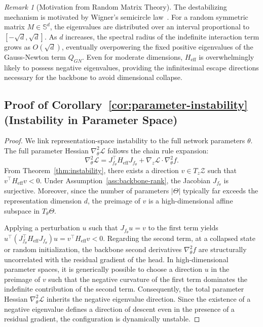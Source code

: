 \documentclass{article}
\theoremstyle{plain}
\theoremstyle{definition}
\theoremstyle{remark}
\newtheorem{remark}[theorem]{Remark}
\begin{document}
\begin{remark}[Motivation from Random Matrix Theory]
The destabilizing mechanism is motivated by Wigner's semicircle law~\citep{rudelson2010nonasymptotic}. For a random symmetric matrix $M \in \mathbb{S}^d$, the eigenvalues are distributed over an interval proportional to $[-\sqrt{d}, \sqrt{d}]$. As $d$ increases, the spectral radius of the indefinite interaction term grows as $O(\sqrt{d})$, eventually overpowering the fixed positive eigenvalues of the Gauss-Newton term $Q_{GN}$. Even for moderate dimensions, $H_{\text{eff}}$ is overwhelmingly likely to possess negative eigenvalues, providing the infinitesimal escape directions necessary for the backbone to avoid dimensional collapse.
\end{remark}

\subsection{Proof of Corollary~\ref{cor:parameter-instability} (Instability in Parameter Space)}

\begin{proof}
We link representation-space instability to the full network parameters $\theta$. The full parameter Hessian $\nabla_\theta^2 \mathcal{L}$ follows the chain rule expansion:
\begin{equation*}
    \label{eq:full-parameter-hessian}
    \nabla_\theta^2 \mathcal{L} = J_{f_\theta}^\top H_{\text{eff}} J_{f_\theta} + \nabla_z \mathcal{L} \cdot \nabla_\theta^2 f.
\end{equation*}
From Theorem~\ref{thm:instability}, there exists a direction $v \in T_z \mathcal{Z}$ such that $v^\top H_{\text{eff}} v < 0$. Under Assumption~\ref{ass:backbone-rank}, the Jacobian $J_{f_\theta}$ is surjective. Moreover, since the number of parameters $|\Theta|$ typically far exceeds the representation dimension $d$, the preimage of $v$ is a high-dimensional affine subspace in $T_\theta \Theta$.

Applying a perturbation $u$ such that $J_{f_\theta} u = v$ to the first term yields $u^\top (J_{f_\theta}^\top H_{\text{eff}} J_{f_\theta}) u = v^\top H_{\text{eff}} v < 0$. Regarding the second term, at a collapsed state or random initialization, the backbone second derivatives $\nabla_\theta^2 f$ are structurally uncorrelated with the residual gradient of the head. In high-dimensional parameter spaces, it is generically possible to choose a direction $u$ in the preimage of $v$ such that the negative curvature of the first term dominates the indefinite contribution of the second term. Consequently, the total parameter Hessian $\nabla_\theta^2 \mathcal{L}$ inherits the negative eigenvalue direction. Since the existence of a negative eigenvalue defines a direction of descent even in the presence of a residual gradient, the configuration is dynamically unstable.
\end{proof}
\end{document}
